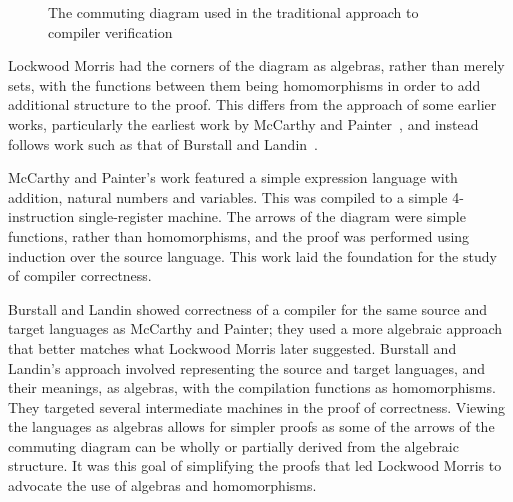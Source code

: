\begin{figure}[ht]
  \begin{center}
  \end{center}
  \caption{The commuting diagram used in the traditional approach to
    compiler verification}
  \label{commuting-diagram}
\end{figure}

Lockwood Morris had the corners of the diagram as algebras, rather
than merely sets, with the functions between them being homomorphisms
in order to add additional structure to the proof.
This differs from the approach of some earlier works, particularly the
earliest work by McCarthy and Painter~\cite{mccarthy1967}, and instead
follows work such as that of Burstall and Landin~\cite{burstall1969}.

McCarthy and Painter's work featured a simple expression language with
addition, natural numbers and variables.
This was compiled to a simple 4-instruction single-register machine.
The arrows of the diagram were simple functions, rather than
homomorphisms, and the proof was performed using induction over the
source language.
This work laid the foundation for the study of compiler correctness.

Burstall and Landin showed correctness of a compiler for the same
source and target languages as McCarthy and Painter; they used a more
algebraic approach that better matches what Lockwood Morris later
suggested.
Burstall and Landin's approach involved representing the source and
target languages, and their meanings, as algebras, with the
compilation functions as homomorphisms.
They targeted several intermediate machines in the proof of
correctness.
Viewing the languages as algebras allows for simpler proofs as some of
the arrows of the commuting diagram can be wholly or partially derived
from the algebraic structure.
It was this goal of simplifying the proofs that led Lockwood Morris to
advocate the use of algebras and homomorphisms.

